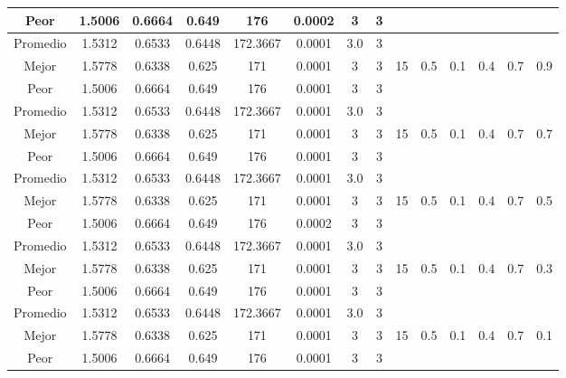 \begin{table}[h!]
\begin{center}
\begin{tabular}{|c|c|c|c|c|c|c|c|c|c|c|c|c|c|}
            \cline{1-8}
            Peor & 1.5006 & 0.6664  & 0.649 & 176 & 0.0002 & 3 & 3 &  &  &  &  &  & \\
        \hline
        \hline
            Promedio  & 1.5312 & 0.6533 & 0.6448 & 172.3667 & 0.0001 & 3.0 & 3 &  &  &  &  &  & \\
            \cline{1-8}
            Mejor & 1.5778 & 0.6338  & 0.625 & 171 & 0.0001 & 3 & 3 & 15 & 0.5 & 0.1 & 0.4 & 0.7 & 0.9\\
            \cline{1-8}
            Peor & 1.5006 & 0.6664  & 0.649 & 176 & 0.0001 & 3 & 3 &  &  &  &  &  & \\
        \hline
        \hline
            Promedio  & 1.5312 & 0.6533 & 0.6448 & 172.3667 & 0.0001 & 3.0 & 3 &  &  &  &  &  & \\
            \cline{1-8}
            Mejor & 1.5778 & 0.6338  & 0.625 & 171 & 0.0001 & 3 & 3 & 15 & 0.5 & 0.1 & 0.4 & 0.7 & 0.7\\
            \cline{1-8}
            Peor & 1.5006 & 0.6664  & 0.649 & 176 & 0.0001 & 3 & 3 &  &  &  &  &  & \\
        \hline
        \hline
            Promedio  & 1.5312 & 0.6533 & 0.6448 & 172.3667 & 0.0001 & 3.0 & 3 &  &  &  &  &  & \\
            \cline{1-8}
            Mejor & 1.5778 & 0.6338  & 0.625 & 171 & 0.0001 & 3 & 3 & 15 & 0.5 & 0.1 & 0.4 & 0.7 & 0.5\\
            \cline{1-8}
            Peor & 1.5006 & 0.6664  & 0.649 & 176 & 0.0002 & 3 & 3 &  &  &  &  &  & \\
        \hline
        \hline
            Promedio  & 1.5312 & 0.6533 & 0.6448 & 172.3667 & 0.0001 & 3.0 & 3 &  &  &  &  &  & \\
            \cline{1-8}
            Mejor & 1.5778 & 0.6338  & 0.625 & 171 & 0.0001 & 3 & 3 & 15 & 0.5 & 0.1 & 0.4 & 0.7 & 0.3\\
            \cline{1-8}
            Peor & 1.5006 & 0.6664  & 0.649 & 176 & 0.0001 & 3 & 3 &  &  &  &  &  & \\
        \hline
        \hline
            Promedio  & 1.5312 & 0.6533 & 0.6448 & 172.3667 & 0.0001 & 3.0 & 3 &  &  &  &  &  & \\
            \cline{1-8}
            Mejor & 1.5778 & 0.6338  & 0.625 & 171 & 0.0001 & 3 & 3 & 15 & 0.5 & 0.1 & 0.4 & 0.7 & 0.1\\
            \cline{1-8}
            Peor & 1.5006 & 0.6664  & 0.649 & 176 & 0.0001 & 3 & 3 &  &  &  &  &  & \\
        \hline

\end{tabular}
\end{center}
\end{table}
